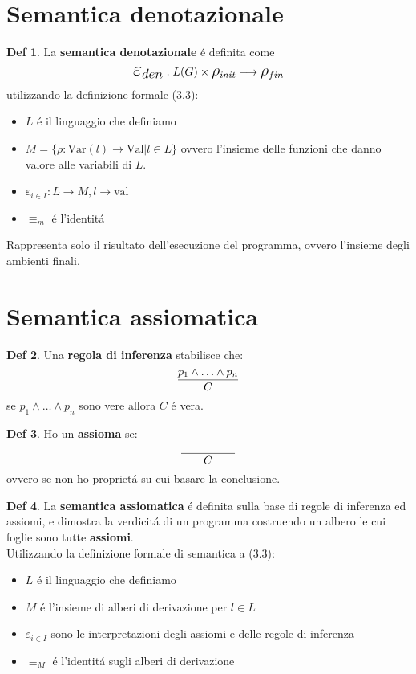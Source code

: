 \documentclass[a4paper]{report}
\theoremstyle{definition} \newtheorem*{defi}{Def}
\theoremstyle{plain} \newtheorem{lemma}{Lemma}
\theoremstyle{plain} \newtheorem{teo}{Teorema}
\theoremstyle{remark} \newtheorem*{es}{Esempio}
\DeclareRobustCommand{\frac}[3][0pt]{%
  {\begingroup\hspace{#1}#2\hspace{#1}\endgroup\over\hspace{#1}#3\hspace{#1}}}
\begin{document}
\section{Semantica denotazionale}
\begin{defi}
	La {\bf semantica denotazionale} \'e definita come
	$$
	\mathlarger{\mathlarger{\mathlarger{\varepsilon_{den}}}} : L(G) \times \mathlarger{\mathlarger{\rho}}_{init} \longrightarrow \mathlarger{\mathlarger{\rho}}_{fin}
	$$
	utilizzando la definizione formale (3.3):
	\begin{itemize}
		\item $L$ \'e il linguaggio che definiamo
		\item $M=\{ \rho : \mathrm{Var}(l) \longrightarrow \mathrm{Val} | l \in L \}$ ovvero l'insieme delle funzioni che danno valore alle variabili di $L$.
		\item $\varepsilon_{i\in I} : L\longrightarrow M , l \longrightarrow \mathrm{val}$
		\item $\equiv_m$ \'e l'identit\'a
	\end{itemize}
\end{defi}
Rappresenta solo il risultato dell'esecuzione del programma, ovvero l'insieme degli ambienti finali.

\section{Semantica assiomatica}
\begin{defi}
	Una {\bf regola di inferenza} stabilisce che:
	$$
	\frac{p_1 \wedge \ldots \wedge p_n}{C}
	$$
	se $ p_1 \wedge \ldots \wedge p_n $ sono vere allora $C$ \'e vera.
\end{defi}
\begin{defi}
	Ho un {\bf assioma} se:
	$$
	\frac[20pt]{}{C}
	$$
	ovvero se non ho propriet\'a su cui basare la conclusione.
\end{defi}
\begin{defi}
	La {\bf semantica assiomatica} \'e definita sulla base di regole di inferenza ed assiomi, e dimostra la verdicit\'a di un programma costruendo un albero le cui foglie sono tutte {\bf assiomi}.
	\\
	Utilizzando la definizione formale di semantica a (3.3):
	\begin{itemize}
		\item $L$ \'e il linguaggio che definiamo
		\item $M$ \'e l'insieme di alberi di derivazione per $l\in L$
		\item $\varepsilon_{i\in I}$ sono le interpretazioni degli assiomi e delle regole di inferenza
		\item $\equiv_M$ \'e l'identit\'a sugli alberi di derivazione
	\end{itemize}
\end{defi}
\end{document}
